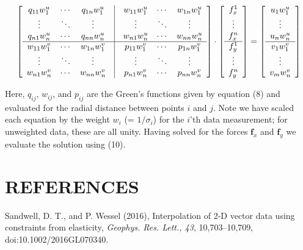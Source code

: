 \documentclass[12pt,letterpaper,margin=0.5in]{report}
\begin{document}
\[
\left[ {\begin{array}{*{20}{c}}
{{q_{11}}w_1^{u}}& \cdots &{{q_{1n}}w_1^{u}}&\vline& {{w_{11}}w_1^{u}}& \cdots &{{w_{1n}}w_1^{u}}\\
 \vdots & \ddots & \vdots &\vline&  \vdots & \ddots & \vdots \\
{{q_{n1}}w_n^{u}}& \cdots &{{q_{nn}}w_n^{u}}&\vline& {{w_{n1}}w_n^{u}}& \cdots &{{w_{nn}}w_n^{u}}\\
\hline
{{w_{11}}w_{1}^{v}}& \cdots &{{w_{1n}}w_{1}^{v}}&\vline& {{p_{11}}w_{1}^{v}}& \cdots &{{p_{1n}}w_{1}^{v}}\\
 \vdots & \ddots & \vdots &\vline&  \vdots & \ddots & \vdots \\
{{w_{n1}}w_{n}^{v}}& \cdots &{{w_{nn}}w_{n}^{v}}&\vline& {{p_{n1}}w_{n}^{v}}& \cdots &{{p_{nn}}w_{n}^{v}}
\end{array}} \right] \cdot \left[ {\begin{array}{*{20}{c}}
{{f _x^1}}\\
 \vdots \\
{{f _x^n}}\\
\hline
{{f _y^1}}\\
 \vdots \\
{{f _y^n}}
\end{array}} \right] = \left[ {\begin{array}{*{20}{c}}
{{u_1}w_1^{u}}\\
 \vdots \\
{{u_n}w_n^{u}}\\
\hline
{{v_1}w_1^{v}}\\
 \vdots \\
{{v_m}w_n^{v}}
\end{array}} \right]
\]

Here, $q_{ij}$, $w_{ij}$, and $p_{ij}$ are the Green’s functions given by equation (8) and evaluated for the
radial distance between points $i$ and $j$.  Note we have scaled each equation by the weight $w_i$
(= $1/\sigma_i$) for the $i$’th data measurement; for unweighted data, these are all unity.
Having solved for the forces ${\mathbf f}_x$ and ${\mathbf f}_y$ we evaluate the solution using (10).

\section{REFERENCES}

Sandwell, D. T., and P. Wessel (2016), Interpolation of 2-D vector data using constraints from elasticity,
{\it Geophys. Res. Lett., 43}, 10,703--10,709, doi:10.1002/2016GL070340.
\end{document}
